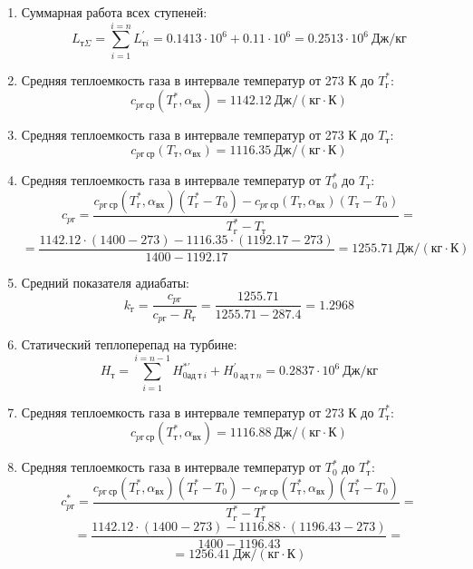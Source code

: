 \documentclass[a4paper,10pt]{article}
\begin{document}
    
    \begin{enumerate}

        \item Суммарная работа всех ступеней:
        \[
            L_{т\Sigma} = \sum_{i=1}^{i=n}{L_{тi}^{\prime}} =
            0.1413\cdot 10^6+0.11\cdot 10^6 = 0.2513 \cdot 10^6 \ Дж/кг
        \]

        \item Средняя теплоемкость газа в интервале температур от 273 К до $T_г^*$:
        \[
            c_{pг\ ср} (T_г^*, \alpha_{вх}) =
            1142.12 \ Дж/(кг \cdot К)
        \]

        \item Средняя теплоемкость газа в интервале температур от 273 К до $T_т$:
        \[
            c_{pг\ ср} (T_т, \alpha_{вх}) =
            1116.35 \ Дж/(кг \cdot К)
        \]

        \item Средняя теплоемкость газа в интервале температур от $T_0^*$ до $T_т$:
        \[
            c_{pг} = \frac{
		         c_{pг\ ср} (T_г^*, \alpha_{вх}) (T_г^* - T_0) - c_{pг\ ср} (T_{т}, \alpha_{вх})(T_т - T_0)
		    }{
		        T_г^* - T_т} =
        \]
        \[    =\frac{
                1142.12 \cdot
                (1400 - 273) -
		        1116.35 \cdot
                (1192.17 - 273)
		    }{
		        1400 - 1192.17} =
		    1255.71 \ Дж / (кг \cdot К)
        \]

        \item Средний показателя адиабаты:
        \[
            k_г = \frac{c_{pг}}{c_{pг} - R_г} =
                \frac{
                    1255.71
                }{
                    1255.71 - 287.4
                }
            = 1.2968
        \]

        \item Статический теплоперепад на турбине:
        \[
            H_т = \sum_{i=1}^{i=n-1}H_{0ад\ т\ i}^{*\prime} + H_{0\ ад\ т\ n}^\prime =
            0.2837 \cdot 10^6 \ Дж/кг
        \]

        \item Средняя теплоемкость газа в интервале температур от 273 К до $T_т^*$:
        \[
            c_{pг\ ср} (T_т^*, \alpha_{вх}) =
            1116.88 \ Дж/(кг \cdot К)
        \]

        \item Средняя теплоемкость газа в интервале температур от $T_0^*$ до $T_т^*$:
        \[
            c_{pг}^* = \frac{
		         c_{pг\ ср} (T_г^*, \alpha_{вх}) (T_г^* - T_0) - c_{pг\ ср} (T_т^*, \alpha_{вх})(T_т^* - T_0)
		    }{
		        T_г^* - T_т^*} =
        \]
        \[    =\frac{
                1142.12 \cdot
                (1400 - 273) -
		        1116.88 \cdot
                (1196.43 - 273)
		    }{
		        1400 - 1196.43} =
        \]
		\[     = 1256.41 \ Дж / (кг \cdot К)
        \]


\end{enumerate}
\end{document}
